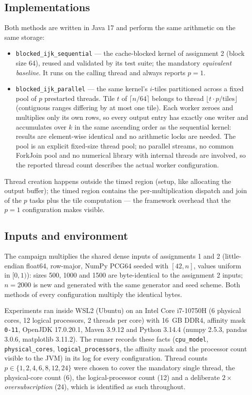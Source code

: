 \documentclass[11pt,a4paper]{article}
\begin{document}
\subsection{Implementations}

Both methods are written in Java 17 and perform the same arithmetic on the
same storage:
\begin{itemize}
    \item \texttt{blocked\_ijk\_sequential} --- the cache-blocked kernel of
    assignment 2 (block size 64), reused and validated by its test suite;
    the mandatory \emph{equivalent baseline}. It runs on the calling thread
    and always reports $p = 1$.
    \item \texttt{blocked\_ijk\_parallel} --- the same kernel's $i$-tiles
    partitioned across a fixed pool of $p$ prestarted threads. Tile $t$ of
    $\lceil n / 64 \rceil$ belongs to thread $\lfloor t \cdot p /
    \text{tiles} \rfloor$ (contiguous ranges differing by at most one
    tile). Each worker zeroes and multiplies only its own rows, so every
    output entry has exactly one writer and accumulates over $k$ in the same
    ascending order as the sequential kernel: results are element-wise
    identical and no arithmetic locks are needed. The pool is an explicit
    fixed-size thread pool; no parallel streams, no common ForkJoin pool and
    no numerical library with internal threads are involved, so the
    reported thread count describes the actual worker configuration.
\end{itemize}
Thread creation happens outside the timed region (setup, like allocating
the output buffer); the timed region contains the per-multiplication
dispatch and join of the $p$ tasks plus the tile computation --- the
framework overhead that the $p = 1$ configuration makes visible.

\subsection{Inputs and environment}

The campaign multiplies the shared dense inputs of assignments 1 and 2
(little-endian float64, row-major, NumPy PCG64 seeded with $[42, n]$, values
uniform in $[0,1)$): sizes 500, 1000 and 1500 are byte-identical to the
assignment 2 inputs; $n = 2000$ is new and generated with the same
generator and seed scheme. Both methods of every configuration multiply the
identical bytes.

Experiments ran inside WSL2 (Ubuntu) on an Intel Core i7-10750H (6 physical
cores, 12 logical processors, 2 threads per core) with 16~GB DDR4, affinity
mask \texttt{0-11}, OpenJDK 17.0.20.1, Maven 3.9.12 and Python 3.14.4
(numpy 2.5.3, pandas 3.0.6, matplotlib 3.11.2). The runner records these
facts (\texttt{cpu\_model}, \texttt{physical\_cores},
\texttt{logical\_processors}, the affinity mask and the processor count
visible to the JVM) in its log for every configuration.
Thread counts $p \in \{1, 2, 4, 6, 8, 12, 24\}$ were chosen to cover the
mandatory single thread, the physical-core count (6), the logical-processor
count (12) and a deliberate $2\times$ \emph{oversubscription} (24), which is
identified as such throughout.
\end{document}
